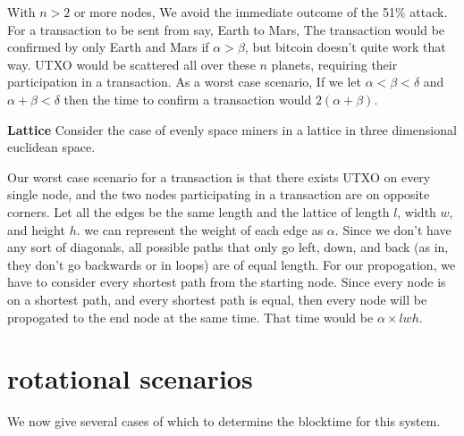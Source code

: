 \documentclass[conference]{IEEEtran}
\begin{document}
With $n > 2$ or more nodes, We avoid the immediate outcome of the 51\% attack. For a transaction to be sent from say, Earth to Mars, The transaction would be confirmed by only Earth and Mars if $\alpha > \beta$, but bitcoin doesn't quite work that way. UTXO would be scattered all over these $n$ planets, requiring their participation in a transaction. As a worst case scenario, If we let $\alpha < \beta < \delta$ and $\alpha + \beta < \delta$ then the  time to confirm a transaction would $2(\alpha + \beta)$.

\textbf{Lattice} Consider the case of evenly space miners in a lattice in three dimensional euclidean space. 
\begin{center}
\end{center}
Our worst case scenario for a transaction is that there exists UTXO on every single node, and the two nodes participating in a transaction are on opposite corners. Let all the edges be the same length and the lattice of length $l$, width $w$, and height $h$. we can represent the weight of each edge as $\alpha$. Since we don't have any sort of diagonals, all possible paths that only go left, down, and back (as in, they don't go backwards or in loops) are of equal length. For our propogation, we have to consider every shortest path from the starting node. Since every node is on a shortest path, and every shortest path is equal, then every node will be propogated to the end node at the same time. That time would be $\alpha \times lwh$.

\section{rotational scenarios}
We now give several cases of which to determine the blocktime for this system. \cite{template}
\end{document}
